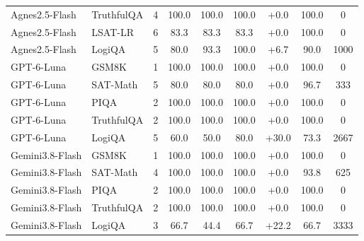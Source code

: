 \begin{tabular*}{\columnwidth}{@{\extracolsep{\fill}} l l c c c c c c c}
Agnes2.5-Flash & TruthfulQA & 4 & 100.0 & 100.0 & 100.0 & +0.0 & 100.0 & 0 \\
Agnes2.5-Flash & LSAT-LR & 6 & 83.3 & 83.3 & 83.3 & +0.0 & 100.0 & 0 \\
Agnes2.5-Flash & LogiQA & 5 & 80.0 & 93.3 & 100.0 & +6.7 & 90.0 & 1000 \\
\midrule
GPT-6-Luna & GSM8K & 1 & 100.0 & 100.0 & 100.0 & +0.0 & 100.0 & 0 \\
GPT-6-Luna & SAT-Math & 5 & 80.0 & 80.0 & 80.0 & +0.0 & 96.7 & 333 \\
GPT-6-Luna & PIQA & 2 & 100.0 & 100.0 & 100.0 & +0.0 & 100.0 & 0 \\
GPT-6-Luna & TruthfulQA & 2 & 100.0 & 100.0 & 100.0 & +0.0 & 100.0 & 0 \\
GPT-6-Luna & LogiQA & 5 & 60.0 & 50.0 & 80.0 & +30.0 & 73.3 & 2667 \\
\midrule
Gemini3.8-Flash & GSM8K & 1 & 100.0 & 100.0 & 100.0 & +0.0 & 100.0 & 0 \\
Gemini3.8-Flash & SAT-Math & 4 & 100.0 & 100.0 & 100.0 & +0.0 & 93.8 & 625 \\
Gemini3.8-Flash & PIQA & 2 & 100.0 & 100.0 & 100.0 & +0.0 & 100.0 & 0 \\
Gemini3.8-Flash & TruthfulQA & 2 & 100.0 & 100.0 & 100.0 & +0.0 & 100.0 & 0 \\
Gemini3.8-Flash & LogiQA & 3 & 66.7 & 44.4 & 66.7 & +22.2 & 66.7 & 3333 \\
\bottomrule
\end{tabular*}